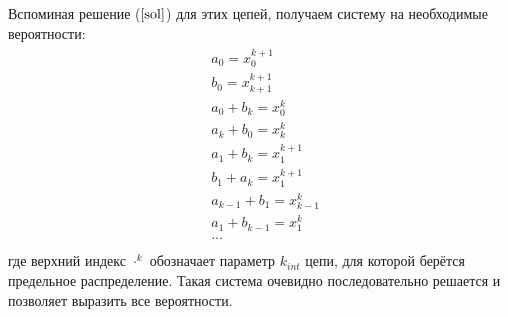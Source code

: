 Вспоминая решение ($\ref{sol}$) для этих цепей, получаем систему на необходимые вероятности:
\begin{align}
	\begin{split}
	\label{general}
	&a_0 = x^{k+1}_0\\
	&b_0 = x^{k+1}_{k+1}\\
	&a_0 + b_{k}= x^{k}_0\\
	&a_k + b_0 = x^k_k \\
	&a_1 + b_k = x^{k+1}_1\\
	&b_1 + a_k = x^{k+1}_1\\
	&a_{k-1} + b_1 = x^k_{k-1}\\
	&a_1+ b_{k-1} = x^k_{1}\\
	&\dots \\
	\end{split}
\end{align}
где верхний индекс $\cdot^k$ обозначает параметр $k_{int}$ цепи, для которой берётся предельное распределение. Такая система очевидно последовательно решается и позволяет выразить все вероятности.


